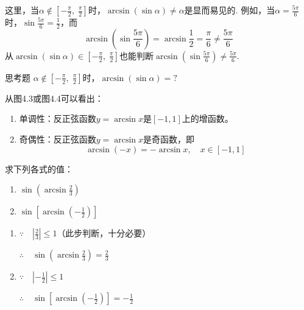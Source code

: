 这里，当$\alpha\notin\left[-\frac{\pi}{2},\; \frac{\pi}{2}\right]$时，$\arcsin(\sin\alpha)\ne \alpha$是显而易见的. 例如，当$\alpha=\frac{5\pi}{6}$时，$\sin\frac{5\pi}{6}=\frac{1}{2}$，而
\[\arcsin\left(\sin\frac{5\pi}{6}\right)=\arcsin\frac{1}{2}=\frac{\pi}{6}\ne \frac{5\pi}{6}\]
从$\arcsin(\sin\alpha)\in \left[-\frac{\pi}{2},\; \frac{\pi}{2}\right]$也能判断$\arcsin\left(\sin\frac{5\pi}{6}\right)\ne \frac{5\pi}{6}$.

\begin{thm}{思考题}
$\alpha\notin  \left[-\frac{\pi}{2},\; \frac{\pi}{2}\right]$时，$\arcsin(\sin\alpha)=?$
\end{thm}

从图4.3或图4.4可以看出：
\begin{enumerate}[(1)]
\item 单调性：反正弦函数$y=\arcsin x$是$[-1,1]$上的增函数。
\item 奇偶性：反正弦函数$y=\arcsin x$是奇函数，即
\[\arcsin(-x)=-\arcsin x,\quad x\in[-1,1]\]
\end{enumerate}

\begin{example}
    求下列各式的值：
\begin{multicols}{2}
\begin{enumerate}[(1)]
    \item $\sin\left(\arcsin\frac{2}{3}\right)$
    \item $\sin\left[\arcsin\left(-\frac{1}{2}\right)\right]$
\end{enumerate}
\end{multicols}
\end{example}

\begin{solution}
\begin{enumerate}[(1)]
    \item $\because\quad \left|\frac{2}{3}\right|\le 1$\hfill （此步判断，十分必要）

$\therefore\quad \sin\left(\arcsin\frac{2}{3}\right)=\frac{2}{3}$

\item $\because\quad \left|-\frac{1}{2}\right|\le 1$

$\therefore\quad \sin\left[\arcsin\left(-\frac{1}{2}\right)\right]=-\frac{1}{2}$
\end{enumerate}
\end{solution}

